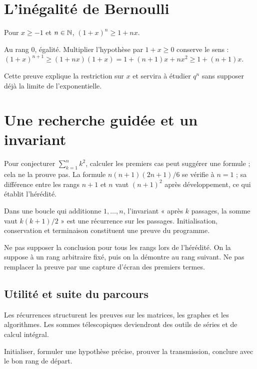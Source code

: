 \documentclass[../cours_tle.tex]{subfiles}
\begin{document}
\section{L'inégalité de Bernoulli}
\begin{theoreme}
Pour $x\ge-1$ et $n\in\mathbb{N}$, $(1+x)^n\ge1+nx$.
\end{theoreme}
\begin{demonstration}
Au rang $0$, égalité. Multiplier l'hypothèse par $1+x\ge0$ conserve le sens :
$(1+x)^{n+1}\ge(1+nx)(1+x)=1+(n+1)x+nx^2\ge1+(n+1)x$.
\end{demonstration}
Cette preuve explique la restriction sur $x$ et servira à étudier $q^n$ sans supposer déjà la limite de l'exponentielle.
\section{Une recherche guidée et un invariant}
Pour conjecturer $\sum_{k=1}^n k^2$, calculer les premiers cas peut suggérer une formule ; cela ne la prouve pas. La formule
$n(n+1)(2n+1)/6$ se vérifie à $n=1$ ; sa différence entre les rangs $n+1$ et $n$ vaut $(n+1)^2$ après développement, ce qui établit l'hérédité.

Dans une boucle qui additionne $1,\ldots,n$, l'invariant « après $k$ passages, la somme vaut $k(k+1)/2$ » est une récurrence sur les passages. Initialisation, conservation et terminaison constituent une preuve du programme.
\begin{attention}
Ne pas supposer la conclusion pour tous les rangs lors de l'hérédité. On la suppose à un rang arbitraire fixé, puis on la démontre au rang suivant. Ne pas remplacer la preuve par une capture d'écran des premiers termes.
\end{attention}
\begin{finchapitre}
\section{Utilité et suite du parcours}
Les récurrences structurent les preuves sur les matrices, les graphes et les algorithmes. Les sommes télescopiques deviendront des outils de séries et de calcul intégral.
\begin{retenir}
Initialiser, formuler une hypothèse précise, prouver la transmission, conclure avec le bon rang de départ.
\end{retenir}
\end{finchapitre}
\end{document}

